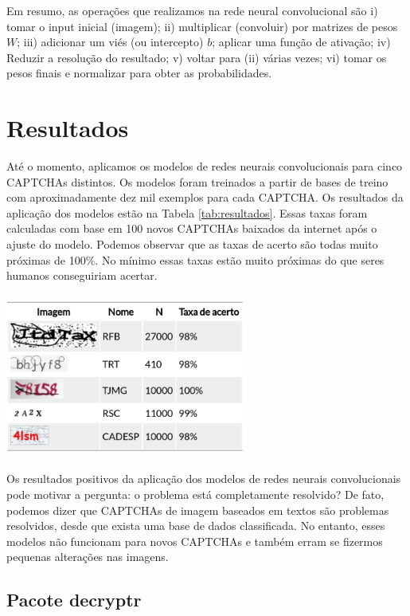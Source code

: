 \documentclass[]{elsarticle} %
\begin{document}
Em resumo, as operações que realizamos na rede neural convolucional são i) tomar o input inicial (imagem); ii) multiplicar (convoluir) por matrizes de pesos \(W\); iii) adicionar um viés (ou intercepto) \(b\); aplicar uma função de ativação; iv) Reduzir a resolução do resultado; v) voltar para (ii) várias vezes; vi) tomar os pesos finais e normalizar para obter as probabilidades.

\hypertarget{resultados}{%
\section{Resultados}\label{resultados}}

Até o momento, aplicamos os modelos de redes neurais convolucionais para cinco CAPTCHAs distintos. Os modelos foram treinados a partir de bases de treino com aproximadamente dez mil exemplos para cada CAPTCHA. Os resultados da aplicação dos modelos estão na Tabela \ref{tab:resultados}. Essas taxas foram calculadas com base em 100 novos CAPTCHAs baixados da internet após o ajuste do modelo. Podemos observar que as taxas de acerto são todas muito próximas de 100\%. No mínimo essas taxas estão muito próximas do que seres humanos conseguiriam acertar.

\begin{center}\includegraphics[width=0.6\textwidth]{imgs/results} \end{center}

Os resultados positivos da aplicação dos modelos de redes neurais convolucionais pode motivar a pergunta: o problema está completamente resolvido? De fato, podemos dizer que CAPTCHAs de imagem baseados em textos são problemas resolvidos, desde que exista uma base de dados classificada. No entanto, esses modelos não funcionam para novos CAPTCHAs e também erram se fizermos pequenas alterações nas imagens.

\hypertarget{pacote-decryptr}{%
\subsection{Pacote decryptr}\label{pacote-decryptr}}
\end{document}
